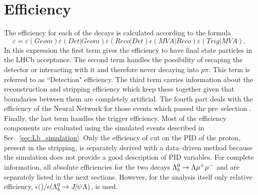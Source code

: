 \chapter{Efficiency}
\label{sec:Lb_eff}

The efficiency for each of the decays is calculated according to the formula
\begin{equation}
\varepsilon=\varepsilon(Geom)\varepsilon(Det|Geom)\varepsilon(Reco|Det)\epsilon(MVA|Reco)\varepsilon(Trig|MVA).
\end{equation}
In this expression the first term gives the efficiency to have final state particles in the LHCb acceptance.
The second term handles the possibility of \Lz escaping the detector or interacting with it and therefore
never decaying into $p\pi$. This term is referred to as ``Detection" efficiency.
The third term carries information about the reconstruction and stripping efficiency
which keep these together given that boundaries between them are completely artificial.
The fourth part deals with the efficiency of the Neural Network for those events which passed the pre--selection . 
Finally, the last term handles the trigger efficiency.
Most of the efficiency components are evaluated using the simulated events described in Sec.~\ref{sec:Lb_simulation}.
Only the efficiency of cut on the PID of the proton, present in the stripping, is separately derived
with a data--driven method because the simulation does not provide a good description of PID variables.
For complete information, all absolute efficiencies for the two decays $\Lambda^0_b\rightarrow\Lambda\mu^+\mu^-$ and \Lb\to\jpsi\Lz are
separately listed in the next sections. However, for the analysis itself only relative efficiency,
$\epsilon($\Lb\to\Lz\mumu$)/\epsilon(\Lb\to\jpsi\Lz)$, is used. 


